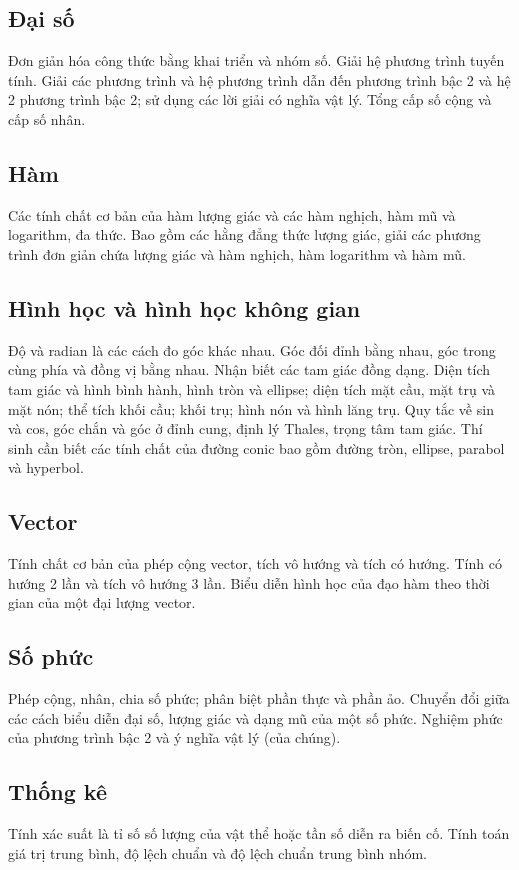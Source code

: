 \documentclass{article}
\begin{document}
\begin{multicols}{2}
\subsection{Đại số}
Đơn giản hóa công thức bằng khai triển và nhóm số. Giải hệ phương trình tuyến tính. Giải các phương trình và hệ phương trình dẫn đến phương trình bậc 2 và hệ 2 phương trình bậc 2; sử dụng các lời giải có nghĩa vật lý. Tổng cấp số cộng và cấp số nhân.

\subsection{Hàm}
Các tính chất cơ bản của hàm lượng giác và các hàm nghịch, hàm mũ và logarithm, đa thức. Bao gồm các hằng đẳng thức lượng giác, giải các phương trình đơn giản chứa lượng giác và hàm nghịch, hàm logarithm và hàm mũ.

\subsection{Hình học và hình học không gian}
Độ và radian là các cách đo góc khác nhau. Góc đối đỉnh bằng nhau, góc trong cùng phía và đồng vị bằng nhau. Nhận biết các tam giác đồng dạng. Diện tích tam giác và hình bình hành, hình tròn và ellipse; diện tích mặt cầu, mặt trụ và mặt nón; thể tích khối cầu; khối trụ; hình nón và hình lăng trụ. Quy tắc về sin và cos, góc chắn và góc ở đỉnh cung, định lý Thales, trọng tâm tam giác. Thí sinh cần biết các tính chất của đường conic bao gồm đường tròn, ellipse, parabol và hyperbol.

\subsection{Vector}
Tính chất cơ bản của phép cộng vector, tích vô hướng và tích có hướng. Tính có hướng 2 lần và tích vô hướng 3 lần. Biểu diễn hình học của đạo hàm theo thời gian của một đại lượng vector.\\

\subsection{Số phức}
Phép cộng, nhân, chia số phức; phân biệt phần thực và phần ảo. Chuyển đổi giữa các cách biểu diễn đại số, lượng giác và dạng mũ của một số phức. Nghiệm phức của phương trình bậc 2 và ý nghĩa vật lý (của chúng).

\subsection{Thống kê}
Tính xác suất là tỉ số số lượng của vật thể hoặc tần số diễn ra biến cố. Tính toán giá trị trung bình, độ lệch chuẩn và độ lệch chuẩn trung bình nhóm.


\end{multicols}
\end{document}
